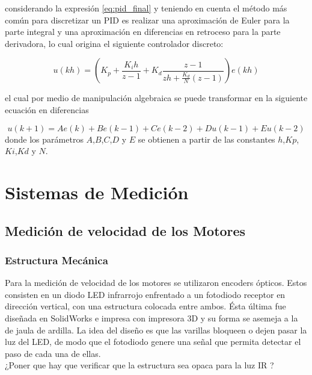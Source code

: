 \documentclass[10pt,conference,a4paper,onecolumn]{article}%
\begin{document}
considerando la expresión \ref{eq:pid_final} y teniendo en cuenta \cite[pág. 219]{astrom} el método más común para discretizar un PID es realizar una aproximación de Euler para la parte integral y una aproximación en diferencias en retroceso para la parte derivadora, lo cual origina el siguiente controlador discreto:

\begin{equation}
  u(kh)=\left(K_p + \frac{K_ih}{z-1} + K_d\frac{z-1}{zh+\frac{K_d}{N}(z-1)}	  \right) e(kh)
\end{equation}  

el cual por medio de manipulación algebraica se puede transformar en la siguiente ecuación en diferencias

\begin{equation}
u(k+1)=Ae(k)+Be(k-1)+Ce(k-2)+Du(k-1)+Eu(k-2)
\end{equation} 
donde los parámetros $A$,$B$,$C$,$D$ y $E$ se obtienen a partir de las constantes $h$,$Kp$,$Ki$,$Kd$ y $N$.
\section{Sistemas de Medición}
\label{sec:sist_de_medicion}
\subsection{Medición de velocidad de los Motores}
\subsubsection{Estructura Mecánica}
Para la medición de velocidad de los motores se utilizaron encoders ópticos. Estos consisten en un diodo LED infrarrojo enfrentado a un fotodiodo receptor en dirección vertical, con una estructura colocada entre ambos. Ésta última fue diseñada en SolidWorks e impresa con impresora 3D y su forma se asemeja a la de jaula de ardilla. La idea del diseño es que las varillas bloqueen o dejen pasar la luz del LED, de modo que el fotodiodo genere una señal que permita detectar el paso de cada una de ellas.
\\
¿Poner que hay que verificar que la estructura sea opaca para la luz IR ?
\end{document}
